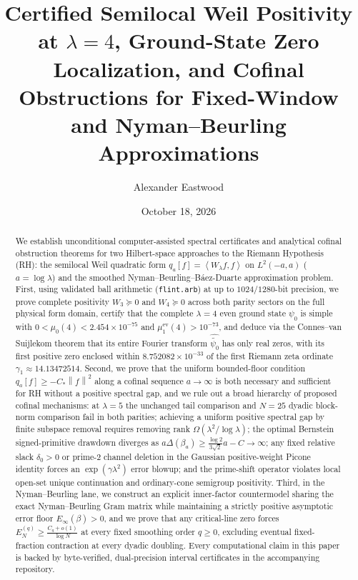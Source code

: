 \documentclass[11pt]{article}
\title{\textbf{Certified Semilocal Weil Positivity at $\lambda = 4$, Ground-State Zero Localization, and Cofinal Obstructions for Fixed-Window and Nyman--Beurling Approximations}}
\author{Alexander Eastwood}
\date{October 18, 2026}
\theoremstyle{remark}
\newcommand{\norm}[1]{\left\lVert #1\right\rVert}
\newcommand{\ip}[2]{\left\langle #1,#2\right\rangle}
\begin{document}
\maketitle

\begin{abstract}
We establish unconditional computer-assisted spectral certificates and analytical cofinal obstruction theorems for two Hilbert-space approaches to the Riemann Hypothesis (RH): the semilocal Weil quadratic form $q_a[f] = \ip{W_\lambda f}{f}$ on $L^2(-a,a)$ ($a = \log\lambda$) and the smoothed Nyman--Beurling--B\'aez-Duarte approximation problem. First, using validated ball arithmetic (\texttt{flint.arb}) at up to $1024/1280$-bit precision, we prove complete positivity $W_3 \succeq 0$ and $W_4 \succeq 0$ across both parity sectors on the full physical form domain, certify that the complete $\lambda = 4$ even ground state $\psi_0$ is simple with $0 < \mu_0(4) < 2.454 \times 10^{-75}$ and $\mu_1^{\mathrm{ev}}(4) > 10^{-73}$, and deduce via the Connes--van Suijlekom theorem that its entire Fourier transform $\widehat{\widetilde{\psi_0}}$ has only real zeros, with its first positive zero enclosed within $8.752082 \times 10^{-33}$ of the first Riemann zeta ordinate $\gamma_1 \approx 14.13472514$. Second, we prove that the uniform bounded-floor condition $q_a[f] \ge -C_*\norm{f}^2$ along a cofinal sequence $a \to \infty$ is both necessary and sufficient for RH without a positive spectral gap, and we rule out a broad hierarchy of proposed cofinal mechanisms: at $\lambda = 5$ the unchanged tail comparison and $N = 25$ dyadic block-norm comparison fail in both parities; achieving a uniform positive spectral gap by finite subspace removal requires removing rank $\Omega(\lambda^2/\log\lambda)$; the optimal Bernstein signed-primitive drawdown diverges as $a\Delta(\beta_a) \ge \frac{\log 2}{3\sqrt{2}}a - C \to \infty$; any fixed relative slack $\delta_0 > 0$ or prime-$2$ channel deletion in the Gaussian positive-weight Picone identity forces an $\exp(\gamma\lambda^2)$ error blowup; and the prime-shift operator violates local open-set unique continuation and ordinary-cone semigroup positivity. Third, in the Nyman--Beurling lane, we construct an explicit inner-factor countermodel sharing the exact Nyman--Beurling Gram matrix while maintaining a strictly positive asymptotic error floor $E_\infty(\beta) > 0$, and we prove that any critical-line zero forces $E_N^{(q)} \ge \frac{C_q + o(1)}{\log N}$ at every fixed smoothing order $q \ge 0$, excluding eventual fixed-fraction contraction at every dyadic doubling. Every computational claim in this paper is backed by byte-verified, dual-precision interval certificates in the accompanying repository.
\end{abstract}
\end{document}
